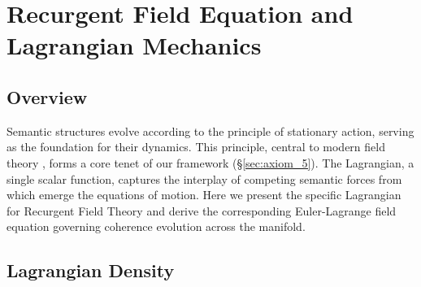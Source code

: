 \chapter{Recurgent Field Equation and Lagrangian Mechanics}
\label{ch:recurgent_field_equation_and_lagrangian_mechanics}


\section{Overview}

Semantic structures evolve according to the principle of stationary action, serving as the foundation for their dynamics. This principle, central to modern field theory \autocite{GoldsteinPooleSafko2002, Arnold1989}, forms a core tenet of our framework (\S\ref{sec:axiom_5}). The Lagrangian, a single scalar function, captures the interplay of competing semantic forces from which emerge the equations of motion. Here we present the specific Lagrangian for Recurgent Field Theory and derive the corresponding Euler-Lagrange field equation governing coherence evolution across the manifold.


\section{Lagrangian Density}
\label{sec:lagrangian_density}

